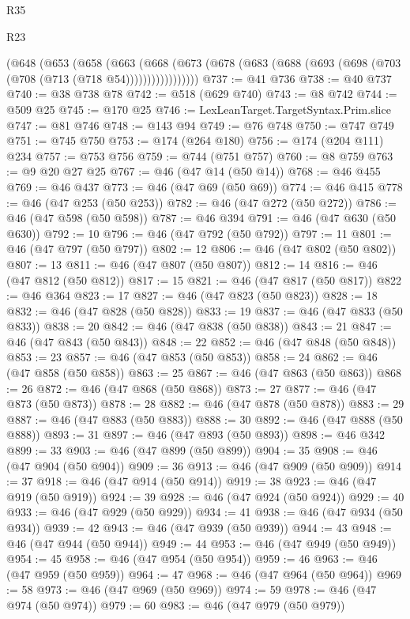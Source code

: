\begin{lexlean}{R35}
\begin{lexlean}{R23}
\begin{coremodule}
{{{{{{{{{{{{{{{{{{{{{        (@648
          (@653
            (@658
              (@663
                (@668
                  (@673 (@678 (@683 (@688 (@693 (@698 (@703 (@708 (@713 (@718 @54)))))))))))))))))
@737 := @41 @736
@738 := @40 @737
@740 := @38 @738 @78
@742 := @518 (@629 @740)
@743 := @8 @742
@744 := @509 @25
@745 := @170 @25
@746 := LexLeanTarget.TargetSyntax.Prim.slice
@747 := @81 @746
@748 := @143 @94
@749 := @76 @748
@750 := @747 @749
@751 := @745 @750
@753 := @174 (@264 @180)
@756 := @174 (@204 @111) @234
@757 := @753 @756
@759 := @744 (@751 @757)
@760 := @8 @759
@763 := @9 @20 @27 @25
@767 := @46 (@47 @14 (@50 @14))
@768 := @46 @455
@769 := @46 @437
@773 := @46 (@47 @69 (@50 @69))
@774 := @46 @415
@778 := @46 (@47 @253 (@50 @253))
@782 := @46 (@47 @272 (@50 @272))
@786 := @46 (@47 @598 (@50 @598))
@787 := @46 @394
@791 := @46 (@47 @630 (@50 @630))
@792 := 10
@796 := @46 (@47 @792 (@50 @792))
@797 := 11
@801 := @46 (@47 @797 (@50 @797))
@802 := 12
@806 := @46 (@47 @802 (@50 @802))
@807 := 13
@811 := @46 (@47 @807 (@50 @807))
@812 := 14
@816 := @46 (@47 @812 (@50 @812))
@817 := 15
@821 := @46 (@47 @817 (@50 @817))
@822 := @46 @364
@823 := 17
@827 := @46 (@47 @823 (@50 @823))
@828 := 18
@832 := @46 (@47 @828 (@50 @828))
@833 := 19
@837 := @46 (@47 @833 (@50 @833))
@838 := 20
@842 := @46 (@47 @838 (@50 @838))
@843 := 21
@847 := @46 (@47 @843 (@50 @843))
@848 := 22
@852 := @46 (@47 @848 (@50 @848))
@853 := 23
@857 := @46 (@47 @853 (@50 @853))
@858 := 24
@862 := @46 (@47 @858 (@50 @858))
@863 := 25
@867 := @46 (@47 @863 (@50 @863))
@868 := 26
@872 := @46 (@47 @868 (@50 @868))
@873 := 27
@877 := @46 (@47 @873 (@50 @873))
@878 := 28
@882 := @46 (@47 @878 (@50 @878))
@883 := 29
@887 := @46 (@47 @883 (@50 @883))
@888 := 30
@892 := @46 (@47 @888 (@50 @888))
@893 := 31
@897 := @46 (@47 @893 (@50 @893))
@898 := @46 @342
@899 := 33
@903 := @46 (@47 @899 (@50 @899))
@904 := 35
@908 := @46 (@47 @904 (@50 @904))
@909 := 36
@913 := @46 (@47 @909 (@50 @909))
@914 := 37
@918 := @46 (@47 @914 (@50 @914))
@919 := 38
@923 := @46 (@47 @919 (@50 @919))
@924 := 39
@928 := @46 (@47 @924 (@50 @924))
@929 := 40
@933 := @46 (@47 @929 (@50 @929))
@934 := 41
@938 := @46 (@47 @934 (@50 @934))
@939 := 42
@943 := @46 (@47 @939 (@50 @939))
@944 := 43
@948 := @46 (@47 @944 (@50 @944))
@949 := 44
@953 := @46 (@47 @949 (@50 @949))
@954 := 45
@958 := @46 (@47 @954 (@50 @954))
@959 := 46
@963 := @46 (@47 @959 (@50 @959))
@964 := 47
@968 := @46 (@47 @964 (@50 @964))
@969 := 58
@973 := @46 (@47 @969 (@50 @969))
@974 := 59
@978 := @46 (@47 @974 (@50 @974))
@979 := 60
@983 := @46 (@47 @979 (@50 @979))
}}}}}}}}}}}}}}}}}}}}}
\end{coremodule}
\end{lexlean}
\end{lexlean}
